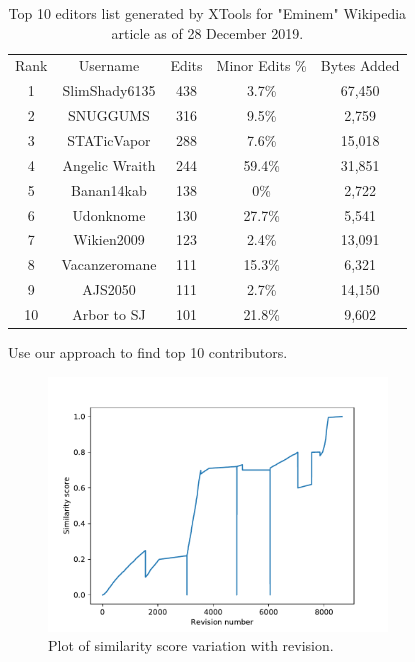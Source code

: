 \documentclass[12pt]{article}
\begin{document}
\begin{table}[]
\begin{tabular}{@{}ccccc@{}}
\toprule
Rank & Username          & Edits & Minor Edits \% & Bytes Added \\
\cmidrule(r){1-1}\cmidrule(lr){2-2}\cmidrule(l){3-3} \cmidrule(l){4-4} \cmidrule(l){5-5}
1    & SlimShady6135  & 438   & 3.7\%         & 67,450      \\
2    & SNUGGUMS       & 316   & 9.5\%         & 2,759       \\
3    & STATicVapor    & 288   & 7.6\%         & 15,018      \\
4    & Angelic Wraith & 244   & 59.4\%        & 31,851      \\
5    & Banan14kab     & 138   & 0\%           & 2,722       \\
6    & Udonknome      & 130   & 27.7\%        & 5,541       \\
7    & Wikien2009     & 123   & 2.4\%         & 13,091      \\
8    & Vacanzeromane  & 111   & 15.3\%        & 6,321       \\
9    & AJS2050        & 111   & 2.7\%         & 14,150      \\
10   & Arbor to SJ    & 101   & 21.8\%        & 9,602       \\ 
\bottomrule
\end{tabular}
\caption{Top 10 editors list generated by XTools for "Eminem" Wikipedia article as of 28 December 2019. }
\label{tab:Xtool_editor}
\end{table}

 
 Use our approach to find top 10 contributors.
 
\begin{figure}[!htb]
    \center \includegraphics[width= 9cm]{images/similarity_score_stephen2.pdf}
    \caption{\label{fig: similarity_score_stephen2} Plot of similarity score variation with revision.}
\end{figure}
\end{document}
